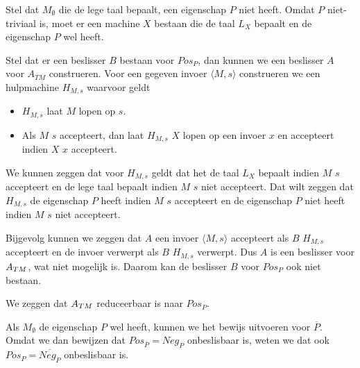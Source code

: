   Stel dat $M_\emptyset$ die de lege taal bepaalt, een eigenschap $P$ niet heeft. Omdat $P$ niet-triviaal is, moet er een machine $X$ bestaan die de taal $L_X$ bepaalt en de eigenschap $P$ wel heeft.

  Stel dat er een beslisser $B$ bestaan voor $Pos_P$, dan kunnen we een beslisser $A$ voor $A_{TM}$ construeren. Voor een gegeven invoer $\langle M,s \rangle$ construeren we een hulpmachine $H_{M,s}$ waarvoor geldt
  \begin{itemize}
  \item $H_{M,s}$ laat $M$ lopen op $s$.
  \item Als $M$ $s$ accepteert, dan laat $H_{M,s}$ $X$ lopen op een invoer $x$ en accepteert indien $X$ $x$ accepteert.
  \end{itemize}
  
  We kunnen zeggen dat voor $H_{M,s}$ geldt dat het de taal $L_X$ bepaalt indien $M$ $s$ accepteert en de lege taal bepaalt indien $M$ $s$ niet accepteert. Dat wilt zeggen dat $H_{M,s}$ de eigenschap $P$ heeft indien $M$ $s$ accepteert en de eigenschap $P$ niet heeft indien $M$ $s$ niet accepteert.
  
  Bijgevolg kunnen we zeggen dat $A$ een invoer $\langle M,s \rangle$ accepteert als $B$ $H_{M,s}$ accepteert en de invoer verwerpt als $B$ $H_{M,s}$ verwerpt. Dus $A$ is een beslisser voor ${A_{TM}}$, wat niet mogelijk is. Daarom kan de beslisser $B$ voor $Pos_P$ ook niet bestaan.
  
  We zeggen dat ${A_{TM}}$ reduceerbaar is naar $Pos_P$.
  
  Als $M_\emptyset$ de eigenschap $P$ wel heeft, kunnen we het bewijs uitvoeren voor $\overline{P}$. Omdat we dan bewijzen dat $Pos_{\overline{P}} = Neg_P$ onbeslisbaar is, weten we dat ook $Pos_P = \overline{Neg_P}$ onbeslisbaar is.
